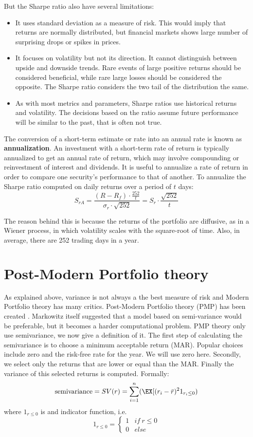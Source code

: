 But the Sharpe ratio also have several limitations:
\begin{itemize}
    \item It uses standard deviation as a measure of risk. This would imply that returns are normally distributed, but financial markets shows large number of surprising drops or spikes in prices. 
    \item It focuses on volatility but not its direction. It cannot distinguish between upside and downside trends. Rare events of large positive returns should be considered beneficial, while rare large losses should be considered the opposite. The Sharpe ratio considers the two tail of the distribution the same. 
    \item As with most metrics and parameters, Sharpe ratios use historical returns and volatility. The decisions based on the ratio assume future performance will be similar to the past, that is often not true.
\end{itemize}

\hfill \break

The conversion of a short-term estimate or rate into an annual rate is known as \textbf{annualization}.
An investment with a short-term rate of return is typically annualized to get an annual rate of return, which may involve compounding or reinvestment of interest and dividends.
It is useful to annualize a rate of return in order to compare one security's performance to that of another. 
To annualize the Sharpe ratio computed on daily returns over a period of $t$ days:
$$ S_{rA} = \frac{(R - R_f) \cdot \frac{252}{t}} {\sigma_r \cdot \sqrt{252}} = S_r \cdot \frac{\sqrt{252}}{t} $$

The reason behind this is because the returns of the portfolio are diffusive, as in a Wiener process, in which volatility scales with the square-root of time. Also, in average, there are 252 trading days in a year.

\section{Post-Modern Portfolio theory}
\label{s:port_modern_portfolio_theory}

As explained above, variance is not always a the best measure of risk and Modern Portfolio theory has many critics. Post-Modern Portfolio theory (PMP) has been created \cite{rom1994post}. Markowitz itself suggested that a model based on semi-variance would be preferable, but it becomes a harder computational problem. PMP theory only use semivariance, we now give a definition of it. 
\hfill \break
The first step of calculating the semivariance is to choose a minimum acceptable return (MAR). Popular choices include zero and the risk-free rate for the year. We will use zero here. Secondly, we select only the returns that are lower or equal than the MAR. Finally the variance of this selected returns is computed.
Formally:
$$ \text{semivariance} = SV(r) = \sum_{i=1}^n (\EX[(r_i-\bar{r})^2 1_{r_i \leq 0})  $$
where $1_{r \leq 0}$ is and indicator function, i.e.
$$ 1_{r \leq 0} = \begin{cases}
    1 & if \ r \leq 0 \\
    0 & else 
\end{cases} $$



